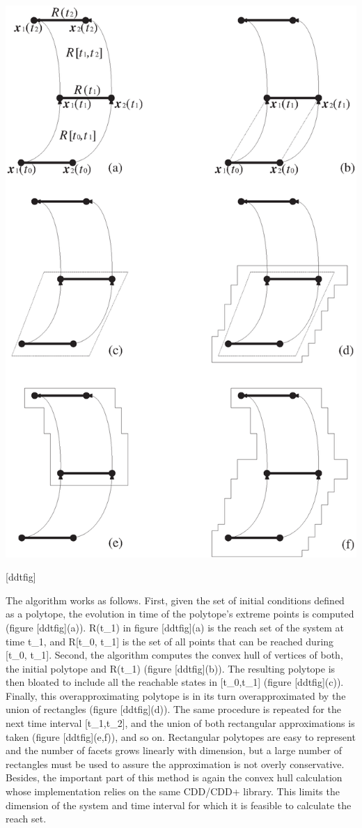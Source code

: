 \documentclass[letterpaper,10pt,english]{sphinxmanual}
\begin{document}
\includegraphics{ddt.eps}

{[}ddtfig{]}

The algorithm works as follows. First, given the set of initial
conditions defined as a polytope, the evolution in time of the
polytope’s extreme points is computed (figure {[}ddtfig{]}(a)).
R(t_1) in figure {[}ddtfig{]}(a) is the reach set of the system at
time t_1, and R[t_0, t_1] is the set of all points that
can be reached during [t_0, t_1]. Second, the algorithm computes
the convex hull of vertices of both, the initial polytope and
R(t_1) (figure {[}ddtfig{]}(b)). The resulting polytope is then
bloated to include all the reachable states in [t_0,t_1] (figure
{[}ddtfig{]}(c)). Finally, this overapproximating polytope is in its turn
overapproximated by the union of rectangles (figure {[}ddtfig{]}(d)). The
same procedure is repeated for the next time interval [t_1,t_2],
and the union of both rectangular approximations is taken (figure
{[}ddtfig{]}(e,f)), and so on. Rectangular polytopes are easy to represent
and the number of facets grows linearly with dimension, but a large
number of rectangles must be used to assure the approximation is not
overly conservative. Besides, the important part of this method is again
the convex hull calculation whose implementation relies on the same
CDD/CDD+ library. This limits the dimension of the system and time
interval for which it is feasible to calculate the reach set.
\end{document}
